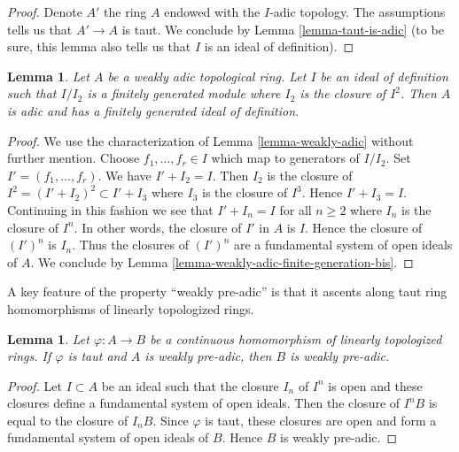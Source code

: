 \documentclass{stacks-project}
\theoremstyle{plain}
\newtheorem{lemma}[subsection]{Lemma}
\theoremstyle{definition}
\theoremstyle{remark}
\numberwithin{equation}{subsection}
\begin{document}
\begin{proof}
Denote $A'$ the ring $A$ endowed with the $I$-adic topology.
The assumptions tells us that $A' \to A$ is taut.
We conclude by Lemma \ref{lemma-taut-is-adic} (to be sure, this
lemma also tells us that $I$ is an ideal of definition).
\end{proof}

\begin{lemma}
\label{lemma-weakly-adic-finite-generation}
Let $A$ be a weakly adic topological ring. Let $I$ be an
ideal of definition such that $I/I_2$ is a finitely generated
module where $I_2$ is the closure of $I^2$.
Then $A$ is adic and has a finitely generated ideal of definition.
\end{lemma}

\begin{proof}
We use the characterization of Lemma \ref{lemma-weakly-adic}
without further mention.
Choose $f_1, \ldots, f_r \in I$ which map to generators of $I/I_2$.
Set $I' = (f_1, \ldots, f_r)$. We have $I' + I_2 = I$.
Then $I_2$ is the closure of $I^2 = (I' + I_2)^2 \subset I' + I_3$
where $I_3$ is the closure of $I^3$. Hence $I' + I_3 = I$.
Continuing in this fashion we see that $I' + I_n = I$ for all $n \geq 2$
where $I_n$ is the closure of $I^n$.
In other words, the closure of $I'$ in $A$ is $I$.
Hence the closure of $(I')^n$ is $I_n$. Thus the closures of $(I')^n$
are a fundamental system of open ideals of $A$.
We conclude by Lemma \ref{lemma-weakly-adic-finite-generation-bis}.
\end{proof}

\noindent
A key feature of the property ``weakly pre-adic'' is that it ascents
along taut ring homomorphisms of linearly topologized rings.

\begin{lemma}
\label{lemma-taut-ascent-weakly-adic}
Let $\varphi : A \to B$ be a continuous homomorphism of
linearly topologized rings. If $\varphi$ is taut and $A$
is weakly pre-adic, then $B$ is weakly pre-adic.
\end{lemma}

\begin{proof}
Let $I \subset A$ be an ideal such that the closure $I_n$ of $I^n$
is open and these closures define a fundamental system of open ideals.
Then the closure of $I^nB$ is equal to the closure of $I_nB$.
Since $\varphi$ is taut, these closures are open and form a fundamental
system of open ideals of $B$. Hence $B$ is weakly pre-adic.
\end{proof}
\end{document}
